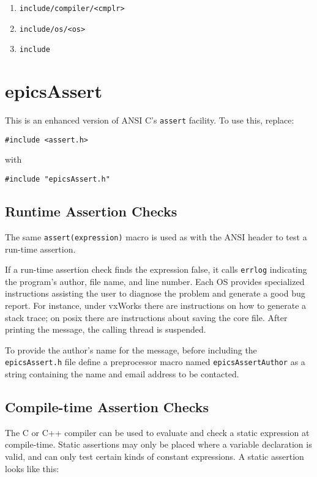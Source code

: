\begin{enumerate}
\item \verb|include/compiler/<cmplr>|
\item \verb|include/os/<os>|
\item \verb|include|
\end{enumerate}

\section{epicsAssert}

This is an enhanced version of ANSI C's \verb|assert| facility. To use this, replace:

\begin{verbatim}
#include <assert.h>
\end{verbatim}

with

\begin{verbatim}
#include "epicsAssert.h"
\end{verbatim}

\subsection{Runtime Assertion Checks}

The same \verb|assert(expression)| macro is used as with the ANSI header to test a run-time assertion.

If a run-time assertion check finds the expression false, it calls \verb|errlog| indicating the program's author, file name, and line number.
Each OS provides specialized instructions assisting the user to diagnose the problem and generate a good bug report.
For instance, under vxWorks there are instructions on how to generate a stack trace; on posix there are instructions about saving the core file.
After printing the message, the calling thread is suspended.

To provide the author's name for the message, before including the \verb|epicsAssert.h| file define a preprocessor macro named \verb|epicsAssertAuthor| as a string containing the name and email address to be contacted.

\subsection{Compile-time Assertion Checks}

The C or C++ compiler can be used to evaluate and check a static expression at compile-time.
Static assertions may only be placed where a variable declaration is valid, and can only test certain kinds of constant expressions.
A static assertion looks like this:

